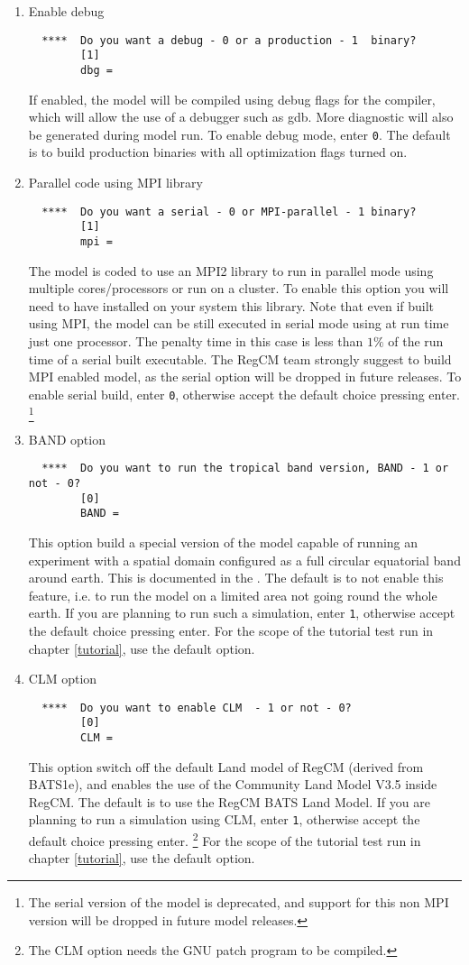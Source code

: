 \begin{enumerate}
\item Enable debug
\begin{Verbatim}
  ****  Do you want a debug - 0 or a production - 1  binary?
        [1]
        dbg =
\end{Verbatim}
If enabled, the model will be compiled using debug flags for the compiler,
which will allow the use of a debugger such as gdb. More diagnostic will
also be generated during model run. To enable debug mode, enter \verb=0=.
The default is to build production binaries with all optimization flags
turned on.
\item Parallel code using MPI library
\begin{Verbatim}
  ****  Do you want a serial - 0 or MPI-parallel - 1 binary?
        [1]
        mpi =
\end{Verbatim}
The model is coded to use an MPI2 library to run in parallel mode using
multiple cores/processors or run on a cluster. To enable this option you
will need to have installed on your system this library. Note that even
if built using MPI, the model can be still executed in serial mode using
at run time just one processor. The penalty time in this case is less than
$1\%$ of the run time of a serial built executable. The RegCM team
strongly suggest to build MPI enabled model, as the serial option will be
dropped in future releases. To enable serial build, enter \verb=0=, otherwise
accept the default choice pressing enter. \footnote{The serial version of the
model is deprecated, and support for this non MPI version will be dropped in
future model releases.}
\item BAND option
\begin{Verbatim}
  ****  Do you want to run the tropical band version, BAND - 1 or not - 0?
        [0]
        BAND =
\end{Verbatim}
This option build a special version of the model capable of running an
experiment with a spatial domain configured as a full circular equatorial
band around earth. This is documented in the \cite{refman_11}.
The default is to not enable this feature, i.e. to run the model on a limited
area not going round the whole earth. If you are planning to run such a
simulation, enter \verb=1=, otherwise accept the default choice pressing enter.
For the scope of the tutorial test run in chapter \ref{tutorial}, use the
default option.
\item CLM option
\begin{Verbatim}
  ****  Do you want to enable CLM  - 1 or not - 0? 
        [0]
        CLM =
\end{Verbatim}
This option switch off the default Land model of RegCM (derived from BATS1e),
and enables the use of the Community Land Model V3.5 inside RegCM. The default
is to use the RegCM BATS Land Model. If you are planning to run a simulation
using CLM, enter \verb=1=, otherwise accept the default choice pressing enter.
\footnote{The CLM option needs the GNU patch program to be compiled.}
For the scope of the tutorial test run in chapter \ref{tutorial}, use the
default option.
\end{enumerate}

